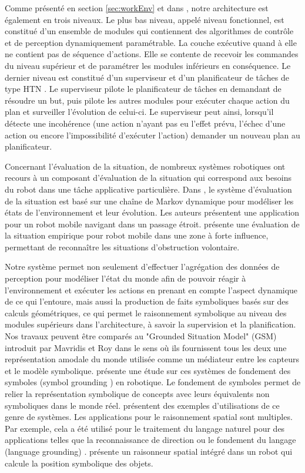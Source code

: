 \documentclass[a4paper,11pt,twoside]{StyleThese}
\begin{document}
Comme présenté en section \ref{sec:workEnv} et dans \cite{Alami1998}, notre architecture est également en trois niveaux. Le plus bas niveau, appelé niveau fonctionnel, est constitué d'un ensemble de modules qui contiennent des algorithmes de contrôle et de perception dynamiquement paramétrable.
La couche exécutive quand à elle ne contient pas de séquence d'actions. Elle se contente de recevoir les commandes du niveau supérieur et de paramétrer les modules inférieurs en conséquence. Le dernier niveau est constitué d'un superviseur \cite{fioreiser2014} et d'un planificateur de tâches de type HTN \cite{Guitton2012}. Le superviseur pilote le planificateur de tâches en demandant de résoudre un but, puis pilote les autres modules pour exécuter chaque action du plan et surveiller l'évolution de celui-ci.
Le superviseur peut ainsi, lorsqu'il détecte une incohérence (une action n'ayant pas eu l'effet prévu, l'échec d'une action ou encore l'impossibilité d'exécuter l'action) demander un nouveau plan au planificateur. 


Concernant l'évaluation de la situation, de nombreux systèmes robotiques ont recours à un composant d'évaluation de la situation qui correspond aux besoins du robot dans une tâche applicative particulière. Dans \cite{beck2011}, le système d'évaluation de la situation est basé sur une chaîne de Markov dynamique pour modéliser les états de l'environnement et leur évolution. Les auteurs présentent une application pour un robot mobile navigant dans un passage étroit.
\cite{Kluge01situationassessment} présente une évaluation de la situation empirique pour robot mobile dans une zone à forte influence, permettant de reconnaître les situations d'obstruction volontaire.

Notre système permet non seulement d'effectuer l'agrégation des données de perception pour modéliser l'état du monde afin de pouvoir réagir à l'environnement et exécuter les actions en prenant en compte l'aspect dynamique de ce qui l'entoure, mais aussi la production de faits symboliques basés sur des calculs géométriques, ce qui permet le raisonnement symbolique au niveau des modules supérieurs dans l'architecture, à savoir la supervision et la planification.
Nos travaux peuvent être comparés au "Grounded Situation Model" (GSM) introduit par Mavridis et Roy \cite{Mavridis2005} dans le sens où ils fournissent tous les deux une représentation amodale du monde utilisée comme un médiateur entre les capteurs et le modèle symbolique. 
\cite{Coradeschi2013} présente une étude sur ces systèmes de fondement des symboles (symbol grounding \cite{harnad1990symbol}) en robotique.
Le fondement de symboles permet de relier la représentation symbolique de concepts avec leurs équivalents non symboliques dans le monde réel.
\cite{Daoutis2009} \cite{Lemaignan2011}
présentent des exemples d'utilisations de ce genre de systèmes.
Les applications pour le raisonnement spatial \cite{OKeefe1999} sont multiples. Par exemple, cela a été utilisé pour le traitement du langage naturel pour des applications telles que la reconnaissance de direction \cite{Kollar10,Matuszek10}
ou le fondement du langage (language grounding) \cite{Tellex10}. \cite{Skubic2004} présente un raisonneur spatial intégré dans un robot qui calcule la position symbolique des objets.
\end{document}
